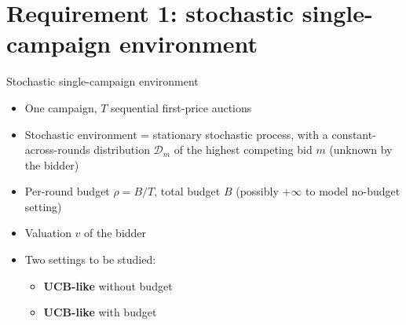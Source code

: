 ﻿\section{Requirement 1: stochastic single-campaign environment}

\begin{frame}{Stochastic single-campaign environment}
    \begin{itemize}
        \item One campaign, $T$ sequential first-price auctions
        \item Stochastic environment = stationary stochastic process, with a constant-across-rounds distribution $\mathcal{D}_m$ of the highest competing bid $m$ (unknown by the bidder)
        \item Per-round budget $\rho = B/T$, total budget $B$ (possibly $+\infty$ to model no-budget setting)
        \item Valuation $v$ of the bidder
        \item Two settings to be studied:
        \begin{itemize}
            \item \textbf{UCB-like} without budget
            \item \textbf{UCB-like} with budget
        \end{itemize}
    \end{itemize}
\end{frame}

